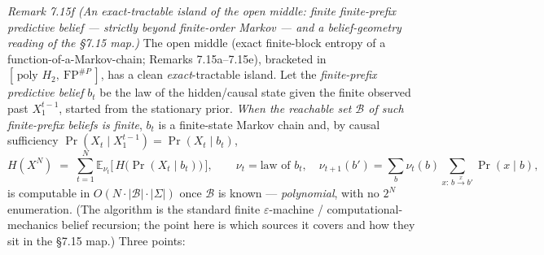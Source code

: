 \documentclass[
]{article}
\begin{document}
\emph{Remark 7.15f (An exact-tractable island of the open middle: finite finite-prefix
predictive belief --- strictly beyond finite-order Markov --- and a belief-geometry
reading of the §7.15 map.)} The open middle (exact finite-block entropy of a
function-of-a-Markov-chain; Remarks 7.15a--7.15e), bracketed in $[\,\text{poly }H_2,\
\mathrm{FP}^{\#P}\,]$, has a clean \emph{exact}-tractable island. Let the
\emph{finite-prefix predictive belief} $b_t$ be the law of the hidden/causal state given
the finite observed past $X_1^{t-1}$, started from the stationary prior. \emph{When the
reachable set $\mathcal B$ of such finite-prefix beliefs is finite}, $b_t$ is a
finite-state Markov chain and, by causal sufficiency $\Pr(X_t\mid X_1^{t-1})=\Pr(X_t\mid
b_t)$,
\[
  H(X^N)\;=\;\sum_{t=1}^N\mathbb E_{\nu_t}\!\bigl[\,H\bigl(\Pr(X_t\mid b_t)\bigr)\,\bigr],
  \qquad \nu_t=\text{law of }b_t,\quad
  \nu_{t+1}(b')=\!\!\sum_b\nu_t(b)\!\!\sum_{x:\,b\xrightarrow{x}b'}\!\!\Pr(x\mid b),
\]
is computable in $O(N\cdot|\mathcal B|\cdot|\Sigma|)$ once $\mathcal B$ is known ---
\emph{polynomial}, with no $2^N$ enumeration. (The algorithm is the standard finite
$\varepsilon$-machine / computational-mechanics belief recursion; the point here is which
sources it covers and how they sit in the §7.15 map.) Three points:
\end{document}

